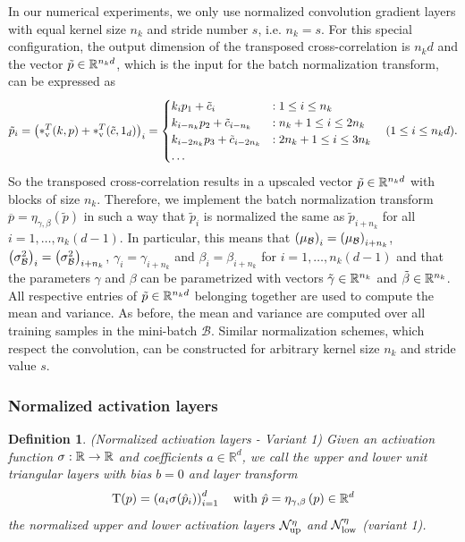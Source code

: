 \documentclass[twoside,a4paper]{article}
\newtheorem{definition}{Definition}
\begin{document}
In our numerical experiments, we only use normalized convolution gradient layers with equal 
kernel size $n_k$ and stride number $s$, i.e. $n_k = s$. For this special configuration,
the output dimension of the transposed cross-correlation is $n_k d$ and
the vector $\tilde{p} \in \mathbb{R}^{n_k d}$, which is the input for the
batch normalization transform, can be expressed as
\begin{equation*}
	\tilde{p}_i = \left( *_{\text{v}}^T(k,p) + *_{\text{v}}^T(\tilde{c},1_d) \right)_i 
	= \begin{cases}
		k_i p_1 + \tilde{c}_i &: 1 \leq i \leq n_k \\
		k_{i - n_k} p_2 + \tilde{c}_{i - n_k} &: n_k+1 \leq i \leq 2n_k \\
		k_{i - 2n_k} p_3 + \tilde{c}_{i - 2n_k} &: 2n_k+1 \leq i \leq 3n_k \\
		\dots
	\end{cases} \quad (1 \leq i \leq n_k d)
	.
\end{equation*}
So the transposed cross-correlation results in a upscaled vector $\tilde{p} \in \mathbb{R}^{n_k d}$ with blocks of size $n_k$.
Therefore, we implement the batch normalization transform 
$\overline{p} = \eta_{\gamma, \beta}(\tilde{p})$ in such a way that $\tilde{p}_i$ is
normalized the same as $\tilde{p}_{i+n_k}$ for all $i = 1, \dots, n_k (d-1)$. In particular, this means that
$\left( \mu_\mathcal{B} \right)_i = \left( \mu_\mathcal{B} \right)_{i+n_k}$, 
$\left( \sigma^2_\mathcal{B} \right)_i = \left( \sigma^2_\mathcal{B} \right)_{i+n_k}$, 
$\gamma_i = \gamma_{i+n_k}$ and $\beta_i = \beta_{i+n_k}$ for $i = 1, \dots, n_k (d-1)$
and that the parameters $\gamma$ and $\beta$ can be parametrized with vectors
$\tilde{\gamma} \in \mathbb{R}^{n_k}$ and $\tilde{\beta} \in \mathbb{R}^{n_k}$. All respective entries of $\tilde{p} \in \mathbb{R}^{n_k d}$ 
belonging together are used to compute the mean and variance.
As before, the mean and variance are computed over all training samples in the mini-batch $\mathcal{B}$.
Similar normalization schemes, which respect the convolution, can be constructed for arbitrary 
kernel size $n_k$ and stride value $s$.

\subsubsection{Normalized activation layers}

\begin{definition}\label{def_norm_activation_layer_1}
	(Normalized activation layers - Variant 1)
	Given an activation function $\sigma : \mathbb{R} \to \mathbb{R}$ and coefficients $a \in \mathbb{R}^d$, 
	we call the upper and lower unit triangular layers with bias $b=0$ and layer transform
	\begin{equation*}
		\mathrm{T}(p) = \left( a_i \sigma(\hat{p}_i) \right)_{i=1}^d
		\quad \text{with } \hat{p} = \eta_{\gamma, \beta} \left( p \right) \in \mathbb{R}^d
	\end{equation*}
	the normalized upper and lower activation layers $\mathcal{N}_{\text{up}}^\eta$ and $\mathcal{N}_{\text{low}}^\eta$
	(variant 1).
\end{definition}
\end{document}

